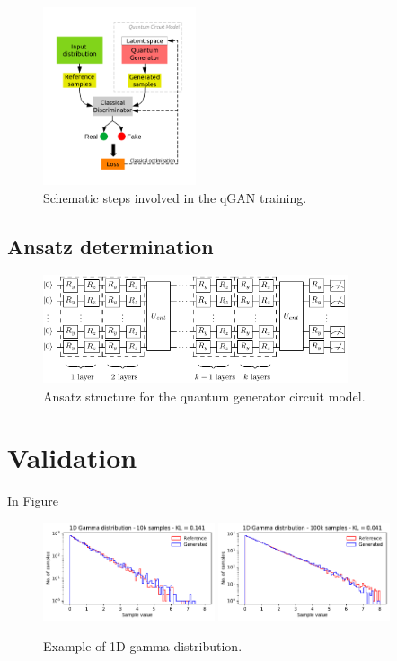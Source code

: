 \documentclass[twocolumn,preprintnumbers,superscriptaddress]{revtex4-2}
\begin{document}
\begin{figure}
  \includegraphics[width=0.4\textwidth]{plots/scheme.pdf}
  \caption{\label{fig:scheme} Schematic steps involved in the qGAN training.}
\end{figure}

\subsection{Ansatz determination}

\begin{figure}
  \includegraphics[width=0.8\textwidth]{plots/ansatz1.pdf}
  \caption{\label{fig:circuit}Ansatz structure for the quantum generator circuit model.}
\end{figure}

\section{Validation}
\label{sec:validation}

In Figure

\begin{figure}
  \includegraphics[width=0.45\textwidth]{plots/1Dgamma/1Dgamma_distribution_10k.pdf}
  \includegraphics[width=0.45\textwidth]{plots/1Dgamma/1Dgamma_distribution_100k.pdf}
  \caption{Example of 1D gamma distribution.}
\end{figure}
\end{document}
